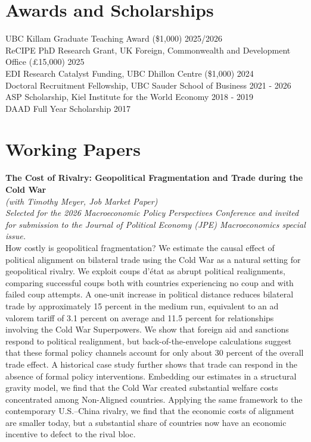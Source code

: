 \documentclass[11pt]{article}
\begin{document}
\section*{Awards and Scholarships}
UBC Killam Graduate Teaching Award (\$1,000) \hfill 2025/2026 \\
ReCIPE PhD Research Grant, UK Foreign, Commonwealth and Development Office (\pounds15,000) \hfill 2025 \\
EDI Research Catalyst Funding, UBC Dhillon Centre (\$1,000) \hfill 2024 \\
Doctoral Recruitment Fellowship, UBC Sauder School of Business \hfill 2021 - 2026 \\
ASP Scholarship, Kiel Institute for the World Economy \hfill 2018 - 2019 \\
DAAD Full Year Scholarship \hfill 2017



\section*{Working Papers}
\textbf{The Cost of Rivalry: Geopolitical Fragmentation and Trade during the Cold War} \\ \emph{(with Timothy Meyer, Job Market Paper)} \\
\emph{Selected for the 2026 Macroeconomic Policy Perspectives Conference and invited for submission to the Journal of Political Economy (JPE) Macroeconomics special issue.} \\
{\small How costly is geopolitical fragmentation? We estimate the causal effect of political alignment on bilateral trade using the Cold War as a natural setting for geopolitical rivalry. We exploit coups d'\'etat as abrupt political realignments, comparing successful coups both with countries experiencing no coup and with failed coup attempts. A one-unit increase in political distance reduces bilateral trade by approximately 15 percent in the medium run, equivalent to an ad valorem tariff of 3.1 percent on average and 11.5 percent for relationships involving the Cold War Superpowers. We show that foreign aid and sanctions respond to political realignment, but back-of-the-envelope calculations suggest that these formal policy channels account for only about 30 percent of the overall trade effect. A historical case study further shows that trade can respond in the absence of formal policy interventions. Embedding our estimates in a structural gravity model, we find that the Cold War created substantial welfare costs concentrated among Non-Aligned countries. Applying the same framework to the contemporary U.S.--China rivalry, we find that the economic costs of alignment are smaller today, but a substantial share of countries now have an economic incentive to defect to the rival bloc.}
\end{document}
